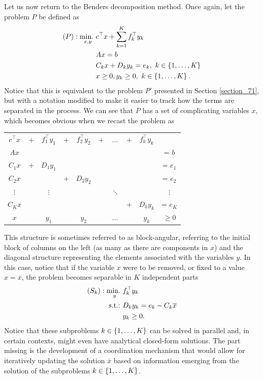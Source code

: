 Let us now return to the Benders decomposition method. Once again, let the problem $P$ be defined as
%
\begin{align*}
	(P) :\mathop{\text{min.~}}_{x,y} & c^\top x + \sum_{k=1}^K f_k^\top y_k \\
		  			 & Ax = b \\
		  			 & C_k x + D_k y_k = e_k, \ k \in \left\{ 1, \dots, K \right \} \\
		  			 & x \geq 0, y_k \geq 0, \ k \in \left\{ 1,\dots, K \right \}. 
\end{align*}
%
Notice that this is equivalent to the problem $P'$ presented in Section \ref{section_71}, but with a notation modified to make it easier to track how the terms are separated in the process. We can see that $P$ has a set of complicating variables $x$, which becomes obvious when we recast the problem as
%
\begin{center}
	\begin{tabular}{cccccccccc}
		 $c^\top x$ & + & $f_1^\top y_1$ & + & $f_2^\top y_2$ & + & $\dots$ & + & $f_k^\top y_k$  &  \\
	 	 $Ax$       &   &                &   &                &   &         &   &                 & = $b$ \\
		 $C_1 x$    & + & $D_1 y_1$      &   &                &   &         &   &                 & = $e_1$  \\
		 $C_2 x$    &   &                & + & $D_2 y_2$      &   &         &   &                 & = $e_2$    \\
		 $\vdots$   &   &  $\vdots$      &   &                &   & $\ddots$&   &                 &  $\vdots$   \\
		 $C_K x$    &   &                &   &                &   &         & + & $D_k y_k$       & = $e_K$  \\
		 $x$        &   & $y_1$          &   &  $y_2$         &   & $\dots$ &   & $y_k$           & $\geq 0$  
	\end{tabular}	
\end{center}
 
This structure is sometimes referred to as block-angular, referring to the initial block of columns on the left (as many as there are components in $x$) and the diagonal structure representing the elements associated with the variables $y$. In this case, notice that if the variable $x$ were to be removed, or fixed to a value $x = \overline{x}$, the problem becomes separable in $K$ independent parts
% 
\begin{align*} 
	(S_k) : \mathop{\text{min.~}}_y & f_k^\top y_k \\
	\mathop{\text{s.t.:~}} & D_ky_k = e_k - C_k \overline{x} \\
	& y_k \geq 0.
\end{align*}
%
Notice that these subproblems $k \in \left\{ 1,\dots, K \right \}$ can be solved in parallel and, in certain contexts, might even have analytical closed-form solutions. The part missing is the development of a coordination mechanism that would allow for iteratively updating the solution $\overline{x}$ based on information emerging from the solution of the subproblems $k \in \left\{ 1,\dots, K \right \}$.

